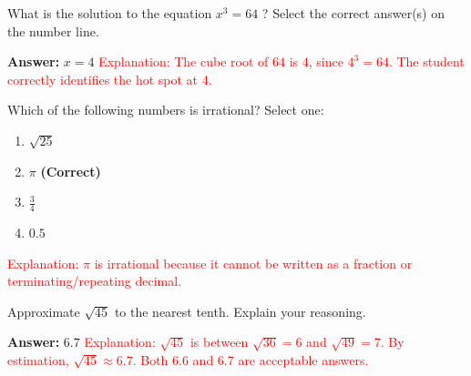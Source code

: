 \documentclass[12pt]{article}
\begin{document}
\begin{tcolorbox}[colframe=black!50, colback=white, title=\textbf{Problem 3 (8.EE.A.2)}]
What is the solution to the equation \(x^3 = 64\) ? Select the correct answer(s) on the number line. 

\textbf{Answer:} \(x = 4\)  
\textcolor{red}{Explanation: The cube root of \(64\) is \(4\), since \(4^3 = 64\). The student correctly identifies the hot spot at 4.}

\vspace{1cm}

\end{tcolorbox}


\begin{tcolorbox}[colframe=black!50, colback=white, title=\textbf{Problem 4 (8.NS.A.1)}]
Which of the following numbers is irrational? Select one:

\begin{enumerate}[label=(\Alph*)]
    \item \( \sqrt{25} \)  
    \item \( \pi \) \textbf{(Correct)}  
    \item \( \frac{3}{4} \)  
    \item \( 0.5 \)
\end{enumerate}
\textcolor{red}{Explanation: \(\pi\) is irrational because it cannot be written as a fraction or terminating/repeating decimal.}
\end{tcolorbox}

\begin{tcolorbox}[colframe=black!50, colback=white, title=\textbf{Problem 5 (8.NS.A.2)}]
Approximate \(\sqrt{45}\) to the nearest tenth. Explain your reasoning.

\textbf{Answer:} \(6.7\)  
\textcolor{red}{Explanation: \(\sqrt{45}\) is between \(\sqrt{36} = 6\) and \(\sqrt{49} = 7\). By estimation, \(\sqrt{45} \approx 6.7\).
 Both 6.6 and 6.7 are acceptable answers.}
\end{tcolorbox}
\end{document}
